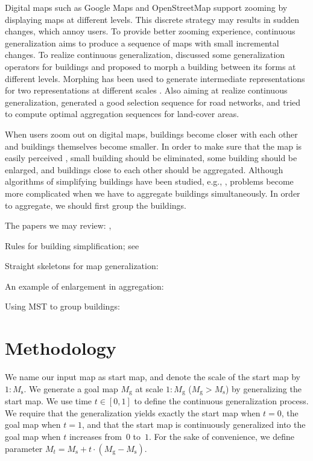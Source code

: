 \documentclass[graybox]{svmult}
\newcommand{\mapg}{\ensuremath{M_\mathrm{g}}\xspace}
\begin{document}
Digital maps such as Google Maps and OpenStreetMap support zooming by 
displaying maps at different levels. 
This discrete strategy may results in sudden changes, which annoy users.
To provide better zooming experience, continuous generalization aims to 
produce 
a sequence of maps with small incremental changes.
To realize continuous generalization, \textcite{Sester2005_CG} discussed some 
generalization operators for buildings and proposed to morph a building 
between 
its forms at different levels. Morphing has been used to generate intermediate 
representations for two representations at different scales 
\parencite{mnwb-mpstc-08,Peng2013_LSA,Deng2015,Peng2016_Admin}. 
Also aiming at 
realize continuous generalization, \textcite{Chimani2014_Eat} generated a good 
selection sequence for road networks, and 
\textcite{Peng2017_AStar} tried to compute optimal aggregation sequences for 
land-cover areas.

When users zoom out on digital maps, buildings become closer with each other 
and buildings themselves become smaller. 
In order to make sure that the map is 
easily perceived \parencite{Weibel1997}, small building should be eliminated, 
some building should be enlarged, and buildings close to each other should be 
aggregated.
Although algorithms of simplifying buildings have been studied, e.g., 
\textcite{Buchin2011_Simp,haunertwolff2010}, problems become more complicated 
when we have to aggregate buildings simultaneously.
In order to aggregate, we should first group the buildings.





\bigskip

The papers we may review:   
\textcite{vanSmaalen2003, Buchin2016, Chaudhry2008, Stoter2009},

Rules for building simplification; see \textcite{Lee2005}

Straight skeletons for map generalization: 
\textcite{Gold2003,Matuk2006}


An example of enlargement in aggregation: 

Using MST to group buildings: \textcite{Zhang2013, 
Cetinkaya2015,Deng2017,Regnauld1996}



\section{Methodology}

We name our input map as start map,
and denote the scale of the start map by $1:M_\mathrm{s}$.
We generate a goal map \mapg at scale $1:M_\mathrm{g}$ 
($M_\mathrm{g} > M_\mathrm{s}$) by generalizing the start map. 
We use time $t\in[0,1]$ to define the continuous generalization
process. 
We require that the generalization yields exactly the start map when $t=0$, 
the goal map when $t=1$, 
and that the start map is continuously generalized into the goal map 
when $t$ increases from~$0$ to~$1$.
For the sake of convenience, we define parameter
$M_t= M_\mathrm{s} + t \cdot (M_\mathrm{g}-M_\mathrm{s})$.
\end{document}
